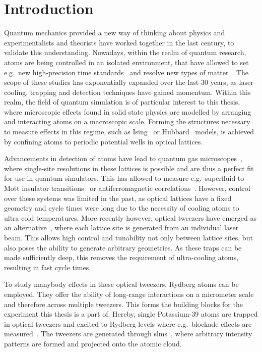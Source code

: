 \chapter{Introduction}

\newcommand{\docite}{\textcolor{red}{~█}}

Quantum mechanics provided a new way of thinking about physics and experimentalists and theorists have worked together in the last century, to validate this understanding. Nowadays, within the realm of quantum research, atoms are being controlled in an isolated environment, that have allowed to set e.g.\ new high-precision time standards~\cite{Brewer2019} and resolve new types of matter~\cite{Anderson1995, Davis1995}. The scope of these studies has exponentially expanded over the last 30 years, as laser-cooling, trapping and detection techniques have gained momentum. Within this realm, the field of quantum simulation is of particular interest to this thesis, where microscopic effects found in solid state physics are modelled by arranging and interacting atoms on a macroscopic scale. Forming the structures necessary to measure effects in this regime, such as Ising~\cite{Schauß2015} or Hubbard~\cite{Boll2016} models, is achieved by confining atoms to periodic potential wells in optical lattices.

Advancements in detection of atoms have lead to quantum gas microscopes~\cite{Bakr2009, Sherson2010}, where single-site resolutions in these lattices is possible and are thus a perfect fit for use in quantum simulators. This has allowed to measure e.g.\ superfluid to Mott insulator transitions~\cite{Sherson2010} or antiferromagnetic correlations~\cite{Boll2016}. However, control over these systems was limited in the past, as optical lattices have a fixed geometry and cycle times were long due to the necessity of cooling atoms to ultra-cold temperatures. More recently however, optical tweezers have emerged as an alternative~\cite{Barredo2016, Endres2016, Norcia2018}, where each lattice site is generated from an individual laser beam. This allows high control and tunability not only between lattice sites, but also poses the ability to generate arbitrary geometries. As these traps can be made sufficiently deep, this removes the requirement of ultra-cooling atoms, resulting in fast cycle times.

To study manybody effects in these optical tweezers, Rydberg atoms can be employed. They offer the ability of long-range interactions on a micrometer scale~\cite{Urban2009} and therefore across multiple tweezers. This forms the building blocks for the experiment this thesis is a part of. Hereby, single Potassium-39 atoms are trapped in optical tweezers and excited to Rydberg levels where e.g.\ blockade effects are measured~\cite{Hirthe2018}. The tweezers are generated through \acp{slm}~\cite{Osterholz2020}, where arbitrary intensity patterns are formed and projected onto the atomic cloud.

